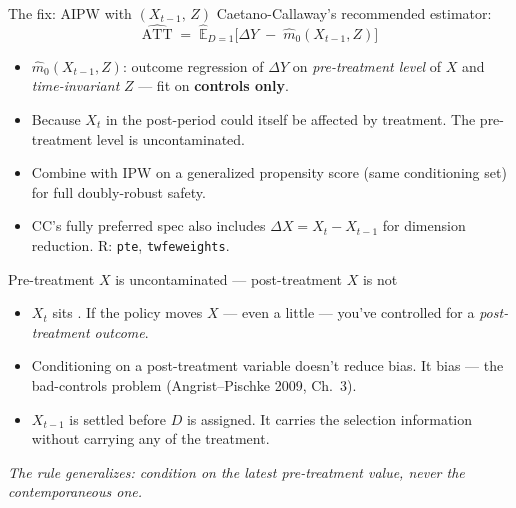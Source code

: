 \documentclass[aspectratio=169,11pt]{beamer}
\begin{document}
\begin{frame}{The fix: AIPW with $(X_{t-1},\, Z)$}
\vspace{0.5em}
Caetano-Callaway's recommended estimator:
\vspace{-0.1em}
\[
\widehat{\text{ATT}} \;=\; \widehat{\mathbb{E}}_{D=1}\!\big[\Delta Y \;-\; \widehat{m}_0(X_{t-1}, Z)\big]
\]
\vspace{0.1em}
\begin{itemize}\small
  \item $\widehat{m}_0(X_{t-1}, Z)$: outcome regression of $\Delta Y$ on \textit{pre-treatment level} of $X$ and \textit{time-invariant} $Z$ --- fit on \textbf{controls only}.
  \item {} \;Because $X_t$ in the post-period could itself be affected by treatment. The pre-treatment level is uncontaminated.
  \item Combine with IPW on a generalized propensity score (same conditioning set) for full doubly-robust safety.
  \item CC's fully preferred spec also includes $\Delta X = X_t - X_{t-1}$ for dimension reduction. R: \texttt{pte}, \texttt{twfeweights}.
\end{itemize}
\end{frame}

\begin{frame}{Pre-treatment $X$ is uncontaminated --- post-treatment $X$ is not}
\vspace{0.4em}
\vspace{0.4em}
\begin{itemize}\small
  \item $X_t$ sits . If the policy moves $X$ --- even a little --- you've controlled for a \textit{post-treatment outcome}.
  \item Conditioning on a post-treatment variable doesn't reduce bias. It  bias --- the bad-controls problem (Angrist--Pischke 2009, Ch.\ 3).
  \item $X_{t-1}$ is settled before $D$ is assigned. It carries the selection information without carrying any of the treatment.
\end{itemize}
\vspace{0.3em}
\begin{center}
\small\color{warmgray}\itshape
The rule generalizes: \;condition on the latest pre-treatment value, never the contemporaneous one.
\end{center}
\end{frame}
\end{document}
